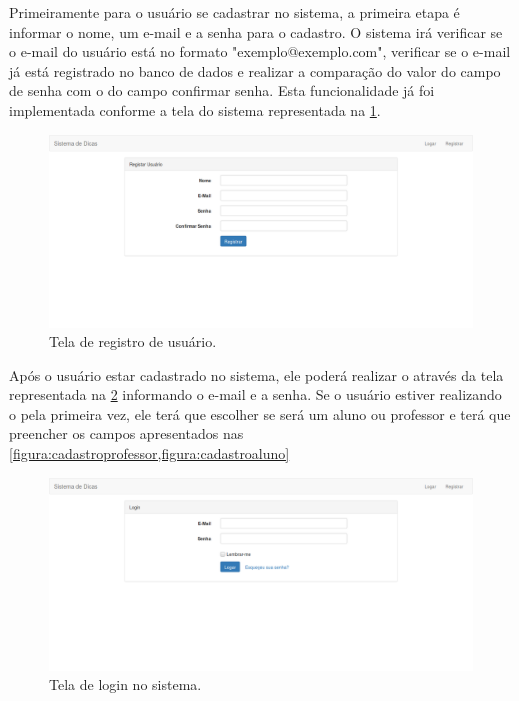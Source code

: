Primeiramente para o usuário se cadastrar no sistema, a primeira etapa é informar o nome, um e-mail e a senha para o cadastro. O sistema irá verificar se o e-mail do usuário está no formato "exemplo@exemplo.com", verificar se o e-mail já está registrado no banco de dados e realizar a comparação do valor do campo de senha com o do campo confirmar senha. Esta funcionalidade já foi implementada conforme a tela do sistema representada na \cref{figura:registrarusuario}.

\begin{figure}[ht]
	\captionsetup{justification=centering}
	\includegraphics[width=\linewidth]{imagens/registrarusuario.png}
	\caption{Tela de registro de usuário.}
	\label{figura:registrarusuario}
\end{figure}

Após o usuário estar cadastrado no sistema, ele poderá realizar o  através da tela representada na \cref{figura:logar} informando o e-mail e a senha. Se o usuário estiver realizando o  pela primeira vez, ele terá que escolher se será um aluno ou professor e terá que preencher os campos apresentados nas \cref{figura:cadastroprofessor,figura:cadastroaluno}

\begin{figure}[ht]
	\captionsetup{justification=centering}
	\includegraphics[width=\linewidth]{imagens/logar.png}
	\caption{Tela de login no sistema.}
	\label{figura:logar}
\end{figure}

